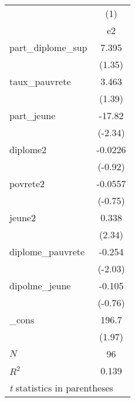 \begin{tabular}{l*{1}{c}}
\toprule
            &\multicolumn{1}{c}{(1)}\\
            &\multicolumn{1}{c}{e2}\\
\midrule
part\_diplome\_sup&       7.395\\
            &      (1.35)\\
\addlinespace
taux\_pauvrete&       3.463\\
            &      (1.39)\\
\addlinespace
part\_jeune  &      -17.82\\
            &     (-2.34)\\
\addlinespace
diplome2    &     -0.0226\\
            &     (-0.92)\\
\addlinespace
povrete2    &     -0.0557\\
            &     (-0.75)\\
\addlinespace
jeune2      &       0.338\\
            &      (2.34)\\
\addlinespace
diplome\_pauvrete&      -0.254\\
            &     (-2.03)\\
\addlinespace
dipolme\_jeune&      -0.105\\
            &     (-0.76)\\
\addlinespace
\_cons      &       196.7\\
            &      (1.97)\\
\midrule
\(N\)       &          96\\
\(R^{2}\)   &       0.139\\
\bottomrule
\multicolumn{2}{l}{\footnotesize \textit{t} statistics in parentheses}\\
\end{tabular}
